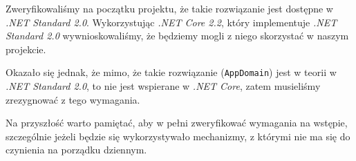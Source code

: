 \documentclass[a4paper,11pt,twoside]{report}
\theoremstyle{definition}
\begin{document}
            Zweryfikowaliśmy na początku projektu, że takie rozwiązanie jest dostępne w \textit{.NET Standard 2.0}. Wykorzystując \textit{.NET Core 2.2}, który implementuje \textit{.NET Standard 2.0} wywnioskowaliśmy, że będziemy mogli z niego skorzystać w naszym projekcie.
            
            Okazało się jednak, że mimo, że takie rozwiązanie (\texttt{AppDomain}) jest w teorii w \textit{.NET Standard 2.0}, to nie jest wspierane w \textit{.NET Core}, zatem musieliśmy zrezygnować z tego wymagania.
            
            Na przyszłość warto pamiętać, aby w pełni zweryfikować wymagania na wstępie, szczególnie jeżeli będzie się wykorzystywało mechanizmy, z którymi nie ma się do czynienia na porządku dziennym.
        


\end{document}
